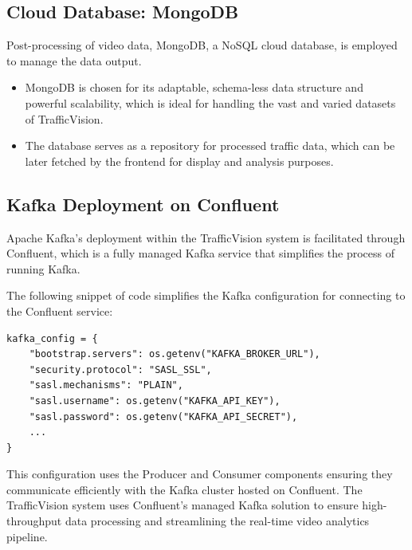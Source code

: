 \subsection{Cloud Database: MongoDB}
Post-processing of video data, MongoDB, a NoSQL cloud database, is employed to manage the data output.
\begin{itemize}
    \item MongoDB is chosen for its adaptable, schema-less data structure and powerful scalability, which is ideal for handling the vast and varied datasets of TrafficVision.
    
    \item The database serves as a repository for processed traffic data, which can be later fetched by the frontend for display and analysis purposes.
\end{itemize}

\subsection{Kafka Deployment on Confluent}
Apache Kafka's deployment within the TrafficVision system is facilitated through Confluent, which is a fully managed Kafka service that simplifies the process of running Kafka.

The following snippet of code simplifies the Kafka configuration for connecting to the Confluent service:

\begin{verbatim}
kafka_config = {
    "bootstrap.servers": os.getenv("KAFKA_BROKER_URL"),
    "security.protocol": "SASL_SSL",
    "sasl.mechanisms": "PLAIN",
    "sasl.username": os.getenv("KAFKA_API_KEY"),
    "sasl.password": os.getenv("KAFKA_API_SECRET"), 
    ...
}
\end{verbatim}

This configuration uses the Producer and Consumer components ensuring they communicate efficiently with the Kafka cluster hosted on Confluent. The TrafficVision system uses Confluent's managed Kafka solution to ensure high-throughput data processing and streamlining the real-time video analytics pipeline.

